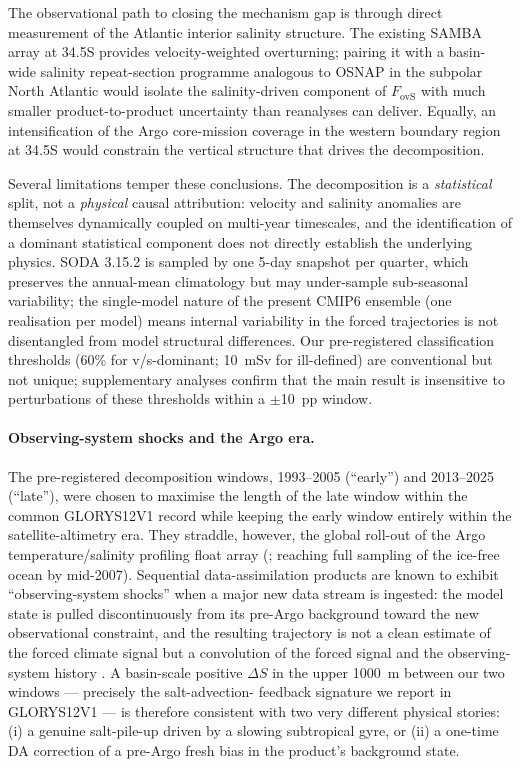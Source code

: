 \documentclass[12pt,a4paper]{article}
\newcommand{\Fovs}{F_\mathrm{ovS}}
\begin{document}
The observational path to closing the mechanism gap is through direct
measurement of the Atlantic interior salinity structure. The existing
SAMBA array at 34.5\textdegree S provides velocity-weighted
overturning; pairing it with a basin-wide salinity repeat-section
programme analogous to OSNAP in the subpolar North Atlantic
would isolate the salinity-driven component of $\Fovs$ with much
smaller product-to-product uncertainty than reanalyses can deliver.
Equally, an intensification of the Argo core-mission coverage in the
western boundary region at 34.5\textdegree S would constrain the
vertical structure that drives the decomposition.

Several limitations temper these conclusions. The decomposition is a
\emph{statistical} split, not a \emph{physical} causal attribution:
velocity and salinity anomalies are themselves dynamically coupled on
multi-year timescales, and the identification of a dominant statistical
component does not directly establish the underlying physics. SODA
3.15.2 is sampled by one 5-day snapshot per quarter, which preserves
the annual-mean climatology but may under-sample sub-seasonal
variability; the single-model nature of the present CMIP6 ensemble
(one realisation per model) means internal variability in the forced
trajectories is not disentangled from model structural differences.
Our pre-registered classification thresholds
(60\% for v/s-dominant; 10~mSv for ill-defined) are conventional but
not unique; supplementary analyses confirm that the main result is
insensitive to perturbations of these thresholds within a
$\pm$10~pp window.

\paragraph{Observing-system shocks and the Argo era.}
The pre-registered decomposition windows, 1993--2005 (``early'') and
2013--2025 (``late''), were chosen to maximise the length of the
late window within the common GLORYS12V1 record while keeping the
early window entirely within the satellite-altimetry era. They
straddle, however, the global roll-out of the Argo
temperature/salinity profiling float array
(\citealp{Roemmich2009}; reaching full sampling of the ice-free
ocean by mid-2007). Sequential data-assimilation products are known
to exhibit ``observing-system shocks'' when a major new data stream
is ingested: the model state is pulled discontinuously from its
pre-Argo background toward the new observational constraint, and
the resulting trajectory is not a clean estimate of the
forced climate signal but a convolution of the forced signal and
the observing-system history
\citep{Balmaseda2013, Palmer2017, Karspeck2017, Jackson2019,
ShiWidlansky2024}. A basin-scale positive $\Delta S$ in the upper
1000~m between our two windows --- precisely the salt-advection-%
feedback signature we report in GLORYS12V1 --- is therefore
consistent with two very different physical stories: (i) a genuine
salt-pile-up driven by a slowing subtropical gyre, or (ii) a
one-time DA correction of a pre-Argo fresh bias in the product's
background state.
\end{document}
